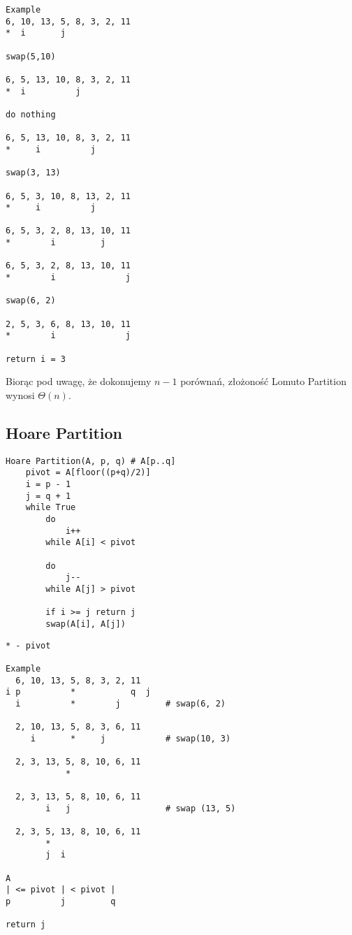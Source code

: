 \documentclass{article}
\begin{document}
\begin{verbatim}
Example
6, 10, 13, 5, 8, 3, 2, 11
*  i       j

swap(5,10)

6, 5, 13, 10, 8, 3, 2, 11
*  i          j

do nothing

6, 5, 13, 10, 8, 3, 2, 11
*     i          j

swap(3, 13)

6, 5, 3, 10, 8, 13, 2, 11
*     i          j

6, 5, 3, 2, 8, 13, 10, 11
*        i         j   

6, 5, 3, 2, 8, 13, 10, 11
*        i              j

swap(6, 2)

2, 5, 3, 6, 8, 13, 10, 11
*        i              j

return i = 3

\end{verbatim}

Biorąc pod uwagę, że dokonujemy $n-1$ porównań, złożoność Lomuto Partition wynosi $\Theta(n)$.

\subsection{Hoare Partition}

\begin{verbatim}
Hoare Partition(A, p, q) # A[p..q]
    pivot = A[floor((p+q)/2)]
    i = p - 1
    j = q + 1
    while True
        do    
            i++
        while A[i] < pivot

        do 
            j--
        while A[j] > pivot

        if i >= j return j
        swap(A[i], A[j])
\end{verbatim}

\begin{verbatim}
* - pivot

Example
  6, 10, 13, 5, 8, 3, 2, 11
i p          *           q  j
  i          *        j         # swap(6, 2)
  
  2, 10, 13, 5, 8, 3, 6, 11
     i       *     j            # swap(10, 3)

  2, 3, 13, 5, 8, 10, 6, 11
            *

  2, 3, 13, 5, 8, 10, 6, 11
        i   j                   # swap (13, 5)

  2, 3, 5, 13, 8, 10, 6, 11
        *
        j  i
    
A
| <= pivot | < pivot |
p          j         q

return j
\end{verbatim}
\end{document}
